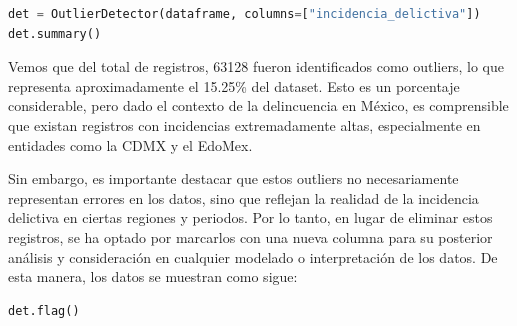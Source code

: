 \begin{lstlisting}[language=Python, caption={Código para detectar outliers en la incidencia delictiva}, label={lst:outlier-detection}]
det = OutlierDetector(dataframe, columns=["incidencia_delictiva"])
det.summary()
\end{lstlisting}

\begin{table}[ht]
  \centering
  \caption{Resumen de Detección de Outliers}
  \scriptsize
  \label{tab:outlier-summary}
\end{table}

Vemos que del total de registros, 63128 fueron identificados como outliers, lo que representa aproximadamente el 15.25\% del dataset. Esto es un
porcentaje considerable, pero dado el contexto de la delincuencia en México, es comprensible que existan registros con incidencias extremadamente
altas, especialmente en entidades como la CDMX y el EdoMex.

Sin embargo, es importante destacar que estos outliers no necesariamente representan errores en los datos, sino que reflejan la realidad de la
incidencia delictiva en ciertas regiones y periodos. Por lo tanto, en lugar de eliminar estos registros, se ha optado por marcarlos con una nueva
columna para su posterior análisis y consideración en cualquier modelado o interpretación de los datos. De esta manera, los datos se muestran como
sigue:

\begin{lstlisting}[language=Python, caption={Código para mostrar el dataset con la columna de outliers}, label={lst:dataset-con-outliers}]
det.flag()
\end{lstlisting}

